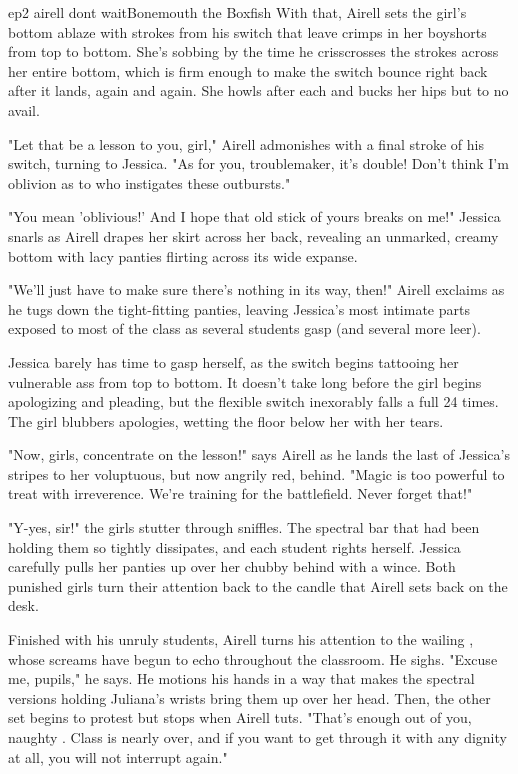 \documentclass{book}
\begin{document}
\begin{childnode}{ep2 airell dont wait}{Bonemouth the Boxfish}
With that, Airell sets the girl's bottom ablaze with strokes from his switch that leave crimps in her boyshorts from top to bottom. She's sobbing by the time he crisscrosses the strokes across her 
entire bottom, which is firm enough to make the switch bounce right back after it lands, again and again. She howls after each and bucks her hips but to no avail.

"Let that be a lesson to you, girl," Airell admonishes with a final stroke of his switch, turning to Jessica. "As for you, troublemaker, it's double! Don't think I'm oblivion as to who instigates 
these outbursts." 

"You mean 'oblivious!' And I hope that old stick of yours breaks on me!" Jessica snarls as Airell drapes her skirt across her back, revealing an unmarked, creamy bottom with lacy panties flirting 
across its wide expanse. 

"We'll just have to make sure there's nothing in its way, then!" Airell exclaims as he tugs down the tight-fitting panties, leaving Jessica's most intimate parts exposed to most of the class as 
several students gasp (and several more leer).

Jessica barely has time to gasp herself, as the switch begins tattooing her vulnerable ass from top to bottom. It doesn't take long before the girl begins apologizing and pleading, but the flexible 
switch inexorably 
falls a full 24 times. The girl blubbers apologies, wetting the floor below her with her tears. 

"Now, girls, concentrate on the lesson!" says Airell as he lands the last of Jessica's stripes to her voluptuous, but now angrily red, behind. "Magic is too powerful to treat with irreverence. We're 
training for the battlefield. Never forget that!"

"Y-yes, sir!" the girls stutter through sniffles. The spectral bar that had been holding them so tightly dissipates, and each student rights herself. Jessica carefully pulls her panties up over her 
chubby behind with a wince. Both punished girls turn their attention back to the candle that Airell sets back on the desk. 

Finished with his unruly students, Airell turns his attention to the wailing \name{}, whose screams have begun to echo throughout the classroom. He sighs. "Excuse me, pupils," he says. He motions 
his hands in a way that makes the spectral versions holding Juliana's wrists bring them up over her head. Then, the other set  \name{} begins to protest 
but stops when Airell tuts. "That's enough out of you, naughty \boygirl{}. Class is nearly over, and if you want to get through it with any dignity at all, you will not interrupt 
again."


\end{childnode}
\end{document}
